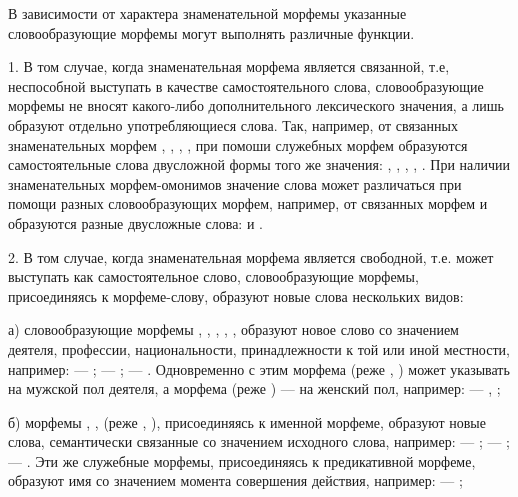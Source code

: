 В зависимости от характера знаменательной морфемы указанные словообразующие морфемы могут выполнять различные функции.

1. В том случае, когда знаменательная морфема является связанной, т.е, неспособной выступать в качестве самостоятельного слова, словообразующие морфемы не
вносят какого-либо дополнительного лексического значения, а лишь образуют отдельно употребляющиеся слова. Так, например, от связанных знаменательных морфем , , , ,  при помоши служебных морфем образуются самостоятельные слова двусложной формы того же значения: , , , , . При наличии знаменательных морфем-омонимов значение слова может различаться при помощи разных словообразующих морфем, например, от связанных морфем  и  образуются разные двусложные слова:  и .

2. В том случае, когда знаменательная морфема является свободной, т.е. может выступать как самостоятельное слово, словообразующие морфемы, присоединяясь к морфеме-слову, образуют новые слова нескольких видов:

а) словообразующие морфемы , , , , ,  образуют новое слово со значением деятеля, профессии, национальности, принадлежности к той или иной местности, например:
 --- ;
 --- ;
 --- .
Одновременно с этим морфема  (реже , ) может указывать на мужской пол деятеля, а морфема  (реже ) --- на женский пол, например:
 ---
, ;

б) морфемы	, ,  (реже , ), присоединяясь к именной морфеме, образуют новые слова, семантически связанные со значением исходного слова, например:
 --- ;
 --- ;
 --- .
Эти же служебные морфемы, присоединяясь к предикативной морфеме, образуют имя со значением момента совершения действия, например:  --- ;

